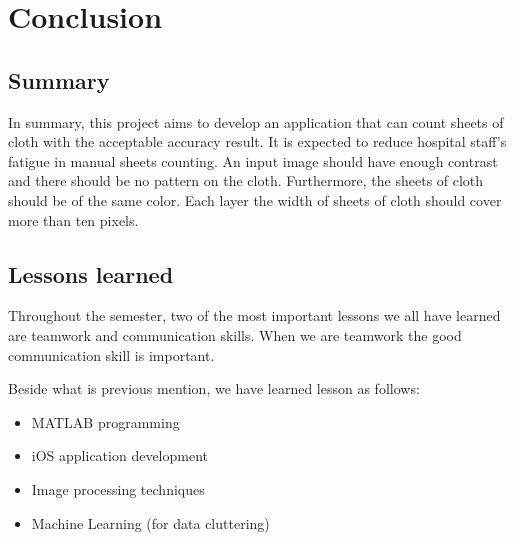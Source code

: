 
\chapter{Conclusion} %

\label{Chapter9} %



\section{Summary}

In summary, this project aims to develop an application that can count sheets of cloth with the acceptable accuracy result. It is expected to reduce hospital staff’s fatigue in manual sheets counting. An input image should have enough contrast and there should be no pattern on the cloth. Furthermore, the sheets of cloth should be of the same color. Each layer the width of sheets of cloth should cover more than ten pixels. 


\section{Lessons learned}
Throughout the semester, two of the most important lessons we all have learned are teamwork and communication skills. When we are teamwork the good communication skill is important.

Beside what is previous mention, we have learned lesson as follows:
\begin{itemize}
	\item {MATLAB programming}
	\item {iOS application development}
	\item {Image processing techniques}
	\item {Machine Learning (for data cluttering)}
\end{itemize}

